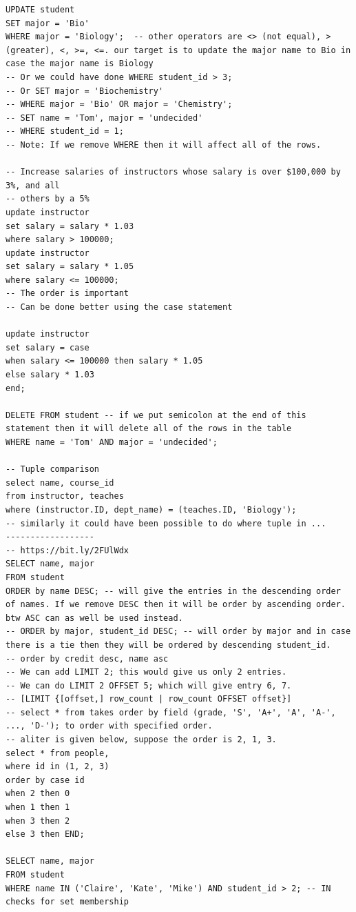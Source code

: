 \documentclass[8pt, a4paper, oneside, twocolumn]{extarticle}
\begin{document}
\begin{verbatim}
UPDATE student
SET major = 'Bio'
WHERE major = 'Biology';  -- other operators are <> (not equal), > (greater), <, >=, <=. our target is to update the major name to Bio in case the major name is Biology
-- Or we could have done WHERE student_id > 3;
-- Or SET major = 'Biochemistry'
-- WHERE major = 'Bio' OR major = 'Chemistry';
-- SET name = 'Tom', major = 'undecided'
-- WHERE student_id = 1;
-- Note: If we remove WHERE then it will affect all of the rows.

-- Increase salaries of instructors whose salary is over $100,000 by 3%, and all
-- others by a 5%
update instructor
set salary = salary * 1.03
where salary > 100000;
update instructor
set salary = salary * 1.05
where salary <= 100000;
-- The order is important
-- Can be done better using the case statement

update instructor
set salary = case
when salary <= 100000 then salary * 1.05
else salary * 1.03
end;

DELETE FROM student -- if we put semicolon at the end of this statement then it will delete all of the rows in the table
WHERE name = 'Tom' AND major = 'undecided';

-- Tuple comparison
select name, course_id
from instructor, teaches
where (instructor.ID, dept_name) = (teaches.ID, 'Biology');
-- similarly it could have been possible to do where tuple in ...
------------------
-- https://bit.ly/2FUlWdx
SELECT name, major
FROM student
ORDER by name DESC; -- will give the entries in the descending order of names. If we remove DESC then it will be order by ascending order. btw ASC can as well be used instead.
-- ORDER by major, student_id DESC; -- will order by major and in case there is a tie then they will be ordered by descending student_id.
-- order by credit desc, name asc
-- We can add LIMIT 2; this would give us only 2 entries.
-- We can do LIMIT 2 OFFSET 5; which will give entry 6, 7.
-- [LIMIT {[offset,] row_count | row_count OFFSET offset}]
-- select * from takes order by field (grade, 'S', 'A+', 'A', 'A-', ..., 'D-'); to order with specified order.
-- aliter is given below, suppose the order is 2, 1, 3.
select * from people, 
where id in (1, 2, 3)
order by case id
when 2 then 0
when 1 then 1
when 3 then 2
else 3 then END;

SELECT name, major
FROM student
WHERE name IN ('Claire', 'Kate', 'Mike') AND student_id > 2; -- IN checks for set membership
\end{verbatim}
\end{document}
